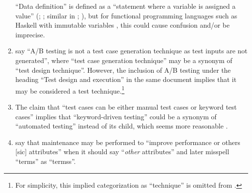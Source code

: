 \begin{enumerate}
          ``Data definition'' is defined as a ``statement where a variable is
          assigned a value'' (\citealp[p.~3]{IEEE2021c};
          \citeyear[p.~115]{IEEE2017}; similar in \citeyear[p.~27]{IEEE2012};
          \citealp[p.~424]{vanVliet2000}), but for functional programming
          languages such as Haskell with immutable variables
          \citep{WikiHaskell2023}, this could cause confusion and/or be
          imprecise.
    \item %
          \citet[p.~36]{IEEE2022} say ``A/B testing is not a test
          case generation technique as test inputs are not generated'', where
          ``test case generation technique'' may be a synonym of ``test design
          technique''. However, the inclusion of A/B testing under the heading
          ``Test design and execution'' in the same document implies that it
          may be considered a test technique.\footnote{For simplicity, this
              implied categorization as ``technique'' is omitted from
              .}
    \item %
          The claim that ``test cases can be either manual test cases or
          keyword test cases'' \citep[p.~6]{IEEE2016} implies that ``keyword-driven
          testing'' could be a synonym of ``automated testing'' instead of its
          child, which seems more reasonable \citeyearpar[p.~4;][p.~35]{IEEE2022}.
    \item %
          \citet{ISO_IEC2014} say that maintenance may be performed to
          ``improve performance or others [sic] attributes'' when it should say
          ``\emph{other} attributes'' and later misspell ``terms'' as ``termss''.


\end{enumerate}
